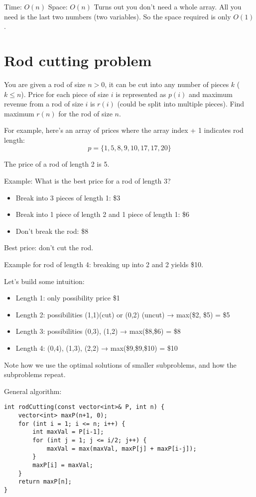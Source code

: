 \documentclass{article}
\begin{document}
Time: \(O(n)\)  
Space: \(O(n)\)  
Turns out you don't need a whole array. All you need is the last two numbers (two variables). So the space required is only \(O(1)\).

\section{Rod cutting problem}

You are given a rod of size \(n > 0\), it can be cut into any number of pieces \(k\) (\(k \le n\)). Price for each piece of size \(i\) is represented as \(p(i)\) and maximum revenue from a rod of size \(i\) is \(r(i)\) (could be split into multiple pieces). Find maximum \(r(n)\) for the rod of size \(n\).

For example, here’s an array of prices where the array index + 1 indicates rod length:
\[
p = \{1, 5, 8, 9, 10, 17, 17, 20\}
\]

The price of a rod of length 2 is 5.

Example: What is the best price for a rod of length 3?

\begin{itemize}
    \item Break into 3 pieces of length 1: \$3
    \item Break into 1 piece of length 2 and 1 piece of length 1: \$6
    \item Don't break the rod: \$8
\end{itemize}

Best price: don't cut the rod.

Example for rod of length 4: breaking up into 2 and 2 yields \$10.

Let's build some intuition:

\begin{itemize}
    \item Length 1: only possibility price \$1
    \item Length 2: possibilities (1,1)(cut) or (0,2) (uncut) → max(\$2, \$5) = \$5
    \item Length 3: possibilities (0,3), (1,2) → max(\$8,\$6) = \$8
    \item Length 4: (0,4), (1,3), (2,2) → max(\$9,\$9,\$10) = \$10
\end{itemize}

Note how we use the optimal solutions of smaller subproblems, and how the subproblems repeat. 

General algorithm:

\begin{lstlisting}[style=cppstyle]
int rodCutting(const vector<int>& P, int n) {
    vector<int> maxP(n+1, 0);
    for (int i = 1; i <= n; i++) {
        int maxVal = P[i-1];
        for (int j = 1; j <= i/2; j++) {
            maxVal = max(maxVal, maxP[j] + maxP[i-j]);
        }
        maxP[i] = maxVal;
    }
    return maxP[n];
}
\end{lstlisting}
\end{document}

